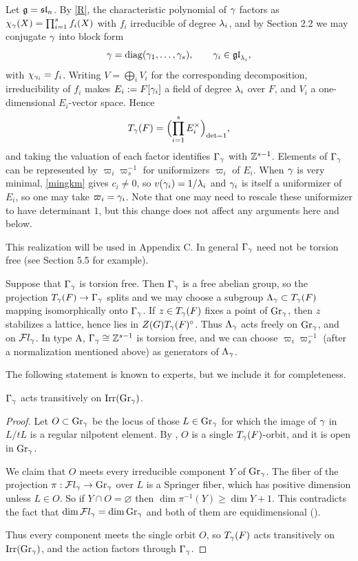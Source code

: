 \documentclass[11pt]{article}
\numberwithin{equation}{section}
\begin{document}
\begin{exa}
Let $\mathfrak{g}=\mathfrak{sl}_n$. By \eqref{R}, the characteristic polynomial of $\gamma$ factors as
$\chi_\gamma(X)=\prod_{i=1}^{s}f_i(X)$ with $f_i$ irreducible of degree $\lambda_i$, and
by Section 2.2 we may conjugate $\gamma$ into block form
\[
\gamma=\operatorname{diag}(\gamma_1,\dots,\gamma_s),\qquad \gamma_i\in\mathfrak{gl}_{\lambda_i},
\]
with $\chi_{\gamma_i}=f_i$. Writing $V=\bigoplus_iV_i$ for the corresponding
decomposition, irreducibility of $f_i$ makes $E_i:=F[\gamma_i]$ a field of degree
$\lambda_i$ over $F$, and $V_i$ a one-dimensional $E_i$-vector space. Hence
\[
T_\gamma(F)=\Bigl(\prod_{i=1}^{s}E_i^\times\Bigr)_{\det=1},
\]
and taking the valuation of each factor identifies $\Gamma_\gamma$ with $\mathbb{Z}^{s-1}$. Elements of $\Gamma_\gamma$ can be represented by $\varpi_i\varpi_s^{-1}$ for uniformizers
$\varpi_i$ of $E_i$. When $\gamma$ is very minimal, \cref{mingkm} gives $c_i\neq0$,
so $v(\gamma_i)=1/\lambda_i$ and $\gamma_i$ is itself a uniformizer of $E_i$, so one may take
$\varpi_i=\gamma_i$. Note that one may need to rescale these uniformizer to have determinant $1$, but this change does not affect any arguments here and below.

This realization will be used in Appendix C. In general $\Gamma_\gamma$ need not be torsion free (see Section 5.5 for example).
\end{exa}

\begin{rem}\label{torsion free free}
Suppose that $\Gamma_\gamma$ is torsion free. Then $\Gamma_\gamma$ is a free abelian group, so the
projection $T_\gamma(F)\to\Gamma_\gamma$ splits and we may choose a subgroup
$\Lambda_\gamma\subset T_\gamma(F)$ mapping isomorphically onto $\Gamma_\gamma$. If
$z\in T_\gamma(F)$ fixes a point of $\operatorname{Gr}_\gamma$, then $z$ stabilizes a lattice,
hence lies in $Z(G)T_\gamma(F)^\circ$. Thus $\Lambda_\gamma$ acts freely on $\operatorname{Gr}_\gamma$, and on
$\mathcal{F}l_\gamma$. In type A, $\Gamma_\gamma\cong\mathbb{Z}^{s-1}$ is torsion free, and we can choose $\varpi_i\varpi_s^{-1}$ (after a normalization mentioned above) as generators of $\Lambda_\gamma$.
\end{rem}

The following statement is known to experts, but we include it for completeness.

\begin{pro}\label{transitive on components}
$\Gamma_\gamma$ acts transitively on $\operatorname{Irr}(\operatorname{Gr}_\gamma)$.
\end{pro}
\begin{proof}
Let $O\subset\operatorname{Gr}_\gamma$ be the locus of those $L\in \operatorname{Gr}_\gamma$ for which the image of $\gamma$ in
$L/tL$ is a regular nilpotent element. By \cite[Proposition a)]{dimensionASF},
$O$ is a single $T_\gamma(F)$-orbit, and it is open in $\operatorname{Gr}_\gamma$.

We claim that $O$ meets every irreducible component $Y$ of $\operatorname{Gr}_\gamma$. The fiber
of the projection $\pi:\mathcal{F}l_\gamma\to\operatorname{Gr}_\gamma$ over $L$ is a Springer fiber, which has positive dimension unless $L\in O$. So if $Y\cap O=\varnothing$ then $\dim\pi^{-1}(Y)\geqslant\dim Y+1$. This contradicts the fact that $\dim \mathcal{F}l_\gamma= \dim \operatorname{Gr}_\gamma$ and both of them are equidimensional (\cite[\S4, Proposition 1 and Corollary 2]{KL88}).

Thus every component meets the single orbit $O$, so $T_\gamma(F)$ acts transitively
on $\operatorname{Irr}(\operatorname{Gr}_\gamma)$, and the action factors through $\Gamma_\gamma$.
\end{proof}
\end{document}
